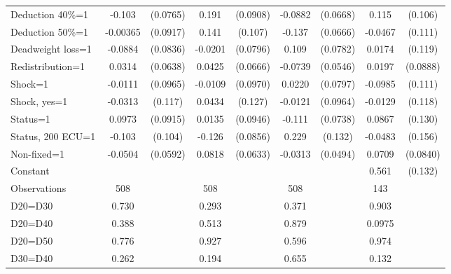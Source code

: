 \begin{tabular}{l|cccccc|cc}
Deduction 40\%=1&   -0.103         & (0.0765)&    0.191\sym{**} & (0.0908)&  -0.0882         & (0.0668)&    0.115         &  (0.106)\\
Deduction 50\%=1& -0.00365         & (0.0917)&    0.141         &  (0.107)&   -0.137\sym{**} & (0.0666)&  -0.0467         &  (0.111)\\
Deadweight loss=1&  -0.0884         & (0.0836)&  -0.0201         & (0.0796)&    0.109         & (0.0782)&   0.0174         &  (0.119)\\
Redistribution=1&   0.0314         & (0.0638)&   0.0425         & (0.0666)&  -0.0739         & (0.0546)&   0.0197         & (0.0888)\\
Shock=1         &  -0.0111         & (0.0965)&  -0.0109         & (0.0970)&   0.0220         & (0.0797)&  -0.0985         &  (0.111)\\
Shock, yes=1    &  -0.0313         &  (0.117)&   0.0434         &  (0.127)&  -0.0121         & (0.0964)&  -0.0129         &  (0.118)\\
Status=1        &   0.0973         & (0.0915)&   0.0135         & (0.0946)&   -0.111         & (0.0738)&   0.0867         &  (0.130)\\
Status, 200 ECU=1&   -0.103         &  (0.104)&   -0.126         & (0.0856)&    0.229\sym{*}  &  (0.132)&  -0.0483         &  (0.156)\\
Non-fixed=1     &  -0.0504         & (0.0592)&   0.0818         & (0.0633)&  -0.0313         & (0.0494)&   0.0709         & (0.0840)\\
Constant        &                  &         &                  &         &                  &         &    0.561\sym{***}&  (0.132)\\
\hline
Observations    &      508         &         &      508         &         &      508         &         &      143         &         \\
D20=D30         &    0.730         &         &    0.293         &         &    0.371         &         &    0.903         &         \\
D20=D40         &    0.388         &         &    0.513         &         &    0.879         &         &   0.0975         &         \\
D20=D50         &    0.776         &         &    0.927         &         &    0.596         &         &    0.974         &         \\
D30=D40         &    0.262         &         &    0.194         &         &    0.655         &         &    0.132         &         \\

\end{tabular}
